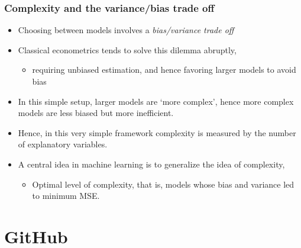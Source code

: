 \documentclass[
  shownotes,
  xcolor={svgnames},
  hyperref={colorlinks,citecolor=DarkBlue,linkcolor=andesred,urlcolor=DarkBlue}
  , aspectratio=169]{beamer}
\begin{document}
\begin{frame}
\frametitle{Complexity and the variance/bias trade off}


\begin{itemize}
  \item Choosing between models involves a {\it bias/variance trade off}
  \medskip
\item Classical econometrics tends to solve this dilemma abruptly, 
  \begin{itemize}
    \item  requiring unbiased estimation, and hence favoring larger models to avoid bias
  \end{itemize}
\medskip
\item In this simple setup, larger models are `more complex', hence more complex models are less biased but more inefficient. 
\medskip
\item Hence, in this very simple framework complexity is measured by the number of explanatory variables. 
\medskip
\item A central idea in machine learning is to generalize the idea of complexity, 
  \begin{itemize}
    \item Optimal level of complexity, that is, models whose bias and variance led to minimum MSE.
  \end{itemize}
\end{itemize}

\end{frame}
\section{GitHub}

\end{document}
